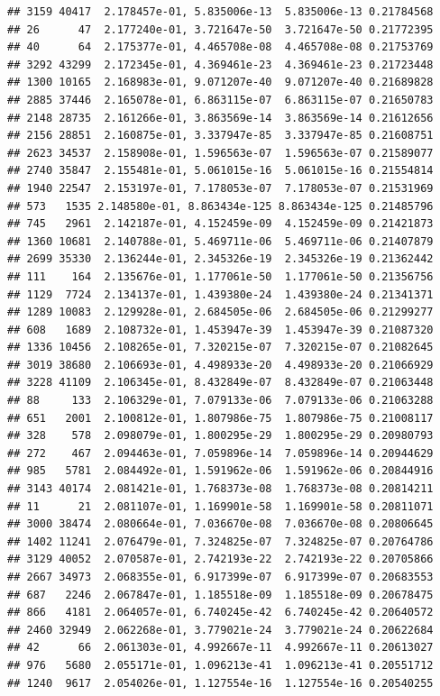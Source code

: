 \documentclass[
]{article}
\begin{document}
\begin{verbatim}
## 3159 40417  2.178457e-01, 5.835006e-13  5.835006e-13 0.21784568
## 26      47  2.177240e-01, 3.721647e-50  3.721647e-50 0.21772395
## 40      64  2.175377e-01, 4.465708e-08  4.465708e-08 0.21753769
## 3292 43299  2.172345e-01, 4.369461e-23  4.369461e-23 0.21723448
## 1300 10165  2.168983e-01, 9.071207e-40  9.071207e-40 0.21689828
## 2885 37446  2.165078e-01, 6.863115e-07  6.863115e-07 0.21650783
## 2148 28735  2.161266e-01, 3.863569e-14  3.863569e-14 0.21612656
## 2156 28851  2.160875e-01, 3.337947e-85  3.337947e-85 0.21608751
## 2623 34537  2.158908e-01, 1.596563e-07  1.596563e-07 0.21589077
## 2740 35847  2.155481e-01, 5.061015e-16  5.061015e-16 0.21554814
## 1940 22547  2.153197e-01, 7.178053e-07  7.178053e-07 0.21531969
## 573   1535 2.148580e-01, 8.863434e-125 8.863434e-125 0.21485796
## 745   2961  2.142187e-01, 4.152459e-09  4.152459e-09 0.21421873
## 1360 10681  2.140788e-01, 5.469711e-06  5.469711e-06 0.21407879
## 2699 35330  2.136244e-01, 2.345326e-19  2.345326e-19 0.21362442
## 111    164  2.135676e-01, 1.177061e-50  1.177061e-50 0.21356756
## 1129  7724  2.134137e-01, 1.439380e-24  1.439380e-24 0.21341371
## 1289 10083  2.129928e-01, 2.684505e-06  2.684505e-06 0.21299277
## 608   1689  2.108732e-01, 1.453947e-39  1.453947e-39 0.21087320
## 1336 10456  2.108265e-01, 7.320215e-07  7.320215e-07 0.21082645
## 3019 38680  2.106693e-01, 4.498933e-20  4.498933e-20 0.21066929
## 3228 41109  2.106345e-01, 8.432849e-07  8.432849e-07 0.21063448
## 88     133  2.106329e-01, 7.079133e-06  7.079133e-06 0.21063288
## 651   2001  2.100812e-01, 1.807986e-75  1.807986e-75 0.21008117
## 328    578  2.098079e-01, 1.800295e-29  1.800295e-29 0.20980793
## 272    467  2.094463e-01, 7.059896e-14  7.059896e-14 0.20944629
## 985   5781  2.084492e-01, 1.591962e-06  1.591962e-06 0.20844916
## 3143 40174  2.081421e-01, 1.768373e-08  1.768373e-08 0.20814211
## 11      21  2.081107e-01, 1.169901e-58  1.169901e-58 0.20811071
## 3000 38474  2.080664e-01, 7.036670e-08  7.036670e-08 0.20806645
## 1402 11241  2.076479e-01, 7.324825e-07  7.324825e-07 0.20764786
## 3129 40052  2.070587e-01, 2.742193e-22  2.742193e-22 0.20705866
## 2667 34973  2.068355e-01, 6.917399e-07  6.917399e-07 0.20683553
## 687   2246  2.067847e-01, 1.185518e-09  1.185518e-09 0.20678475
## 866   4181  2.064057e-01, 6.740245e-42  6.740245e-42 0.20640572
## 2460 32949  2.062268e-01, 3.779021e-24  3.779021e-24 0.20622684
## 42      66  2.061303e-01, 4.992667e-11  4.992667e-11 0.20613027
## 976   5680  2.055171e-01, 1.096213e-41  1.096213e-41 0.20551712
## 1240  9617  2.054026e-01, 1.127554e-16  1.127554e-16 0.20540255

\end{verbatim}
\end{document}
